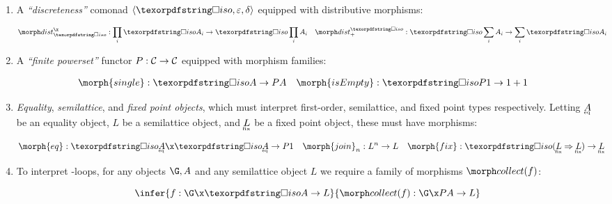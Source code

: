 \begin{enumerate}
\item A \emph{``discreteness''} comonad $\tuple{\disco{}, \varepsilon, \delta}$
  equipped with distributive morphisms:

  \nopagebreak[2]
  \begin{align*}
    \discox &: \prod_i \discof{A_i} \to \disco \prod_i A_i
    &
    \discosum &: \disco \sum_i A_i \to \sum_i \discof{A_i}
  \end{align*}

\item A \emph{``finite powerset''} functor \(P : \mathcal{C} \to \mathcal{C}\) equipped
  with morphism families:

  \nopagebreak[2]
  \begin{align*}
    \morph{single} &: \iso A \to \pfinof{A} &
    \morph{isEmpty} &: \discof{\pfinof{\termO}} \to \termO + \termO
  \end{align*}


\item \emph{Equality}, \emph{semilattice}, and \emph{fixed point objects}, which
  must interpret first-order, semilattice, and fixed point types respectively.
  Letting $\eqt A$ be an equality object, $L$ be a semilattice object, and
  $\fixt L$ be a fixed point object, these must have morphisms:

  \nopagebreak[2]
  \begin{align*}
    \morph{eq} &: \iso{\eqt A} \x \iso{\eqt A} \to \pfinof\termO
    &
    \morph{join}_n &: L^n \to L
    &
    \morph{fix} &: \iso{(\expO{\fixt L}{\fixt L})} \to \fixt L
  \end{align*}

\item To interpret -loops, for any objects $\G, A$ and any
  semilattice object $L$ we require a family of morphisms $\pcollect{f}$:

  \nopagebreak[2]
  \[
    \infer{f : \G \x \iso A \to L}
          {\pcollect{f} : \G \x \pfinof{A} \to L}
  \]


\end{enumerate}

